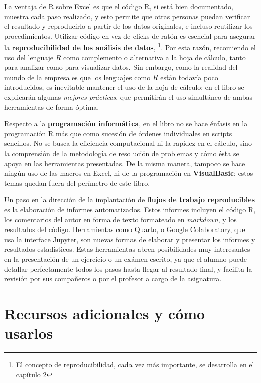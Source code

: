 \documentclass[
  letterpaper,
]{scrbook}
\begin{document}
La ventaja de R sobre Excel es que el código R, si está bien
documentado, muestra cada paso realizado, y esto permite que otras
personas puedan verificar el resultado y reproducirlo a partir de los
datos originales, e incluso reutilizar los procedimientos. Utilizar
código en vez de clicks de ratón es esencial para asegurar la
\textbf{reproducibilidad de los análisis de datos}, \footnote{El
  concepto de reproducibilidad, cada vez más importante, se desarrolla
  en el capítulo 2}. Por esta razón, recomiendo el uso del lenguaje
\(R\) como complemento o alternativa a la hoja de cálculo, tanto para
analizar como para visualizar datos. Sin embargo, como la realidad del
mundo de la empresa es que los lenguajes como \(R\) están todavía poco
introducidos, es inevitable mantener el uso de la hoja de cálculo; en el
libro se explicarán algunas \emph{mejores prácticas}, que permitirán el
uso simultáneo de ambas herramientas de forma óptima.

Respecto a la \textbf{programación informática}, en el libro no se hace
énfasis en la programación R más que como sucesión de órdenes
individuales en scripts sencillos. No se busca la eficiencia
computacional ni la rapidez en el cálculo, sino la comprensión de la
metodología de resolución de problemas y cómo ésta se apoya en las
herramientas presentadas. De la misma manera, tampoco se hace ningún uso
de las macros en Excel, ni de la programación en \textbf{VisualBasic};
estos temas quedan fuera del perímetro de este libro.

Un paso en la dirección de la implantación de \textbf{flujos de trabajo
reproducibles} es la elaboración de informes automatizados. Estos
informes incluyen el código R, los comentarios del autor en forma de
texto formateado en \emph{markdown}, y los resultados del código.
Herramientas como \href{https://quarto.org/}{Quarto}, o
\href{https://colab.research.google.com/}{Google Colaboratory}, que usa
la interface Jupyter, son nuevas formas de elaborar y presentar los
informes y resultados estadísticos. Estas herramientas abren
posibilidades muy interesantes en la presentación de un ejercicio o un
exámen escrito, ya que el alumno puede detallar perfectamente todos los
pasos hasta llegar al resultado final, y facilita la revisión por sus
compañeros o por el profesor a cargo de la asignatura.

\hypertarget{recursos-adicionales-y-cuxf3mo-usarlos}{%
\section*{Recursos adicionales y cómo
usarlos}\label{recursos-adicionales-y-cuxf3mo-usarlos}}
\end{document}
